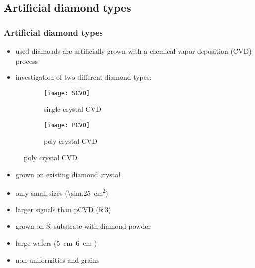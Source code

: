 \subsection{Artificial diamond types}
\begin{frame}
	\frametitle{Artificial diamond types}
	\begin{itemize}
		\item used diamonds are artificially grown with a chemical vapor deposition (CVD) process
		\item investigation of two different diamond types:
	\end{itemize}
	\begin{figure}[htbp] 
		\begin{center}
			\begin{subfigure}{0.45\textwidth}  
				\centering 
				\texttt{[image: SCVD]}
				\caption{single crystal CVD}
			\end{subfigure}
			\begin{subfigure}{0.45\textwidth} 
				\centering 
				\texttt{[image: PCVD]}
				\caption{poly crystal CVD} 	
			\end{subfigure} 
		\end{center}
	\end{figure}
	\begin{minipage}{5.5cm}
		\begin{itemize}
			\item grown on existing diamond crystal
			\item only small sizes (\SI{\sim.25}{cm^2})
			\item larger signals than pCVD ($5:3$)
		\end{itemize}
	\end{minipage}
	\hspace*{2pt}
	\begin{minipage}{5.5cm}
		\begin{itemize}
			\item grown on Si substrate with diamond powder
			\item large wafers (\SIrange{5}{6}{cm} \diameter)
			\item non-uniformities and grains
		\end{itemize}
	\end{minipage}
\end{frame}
